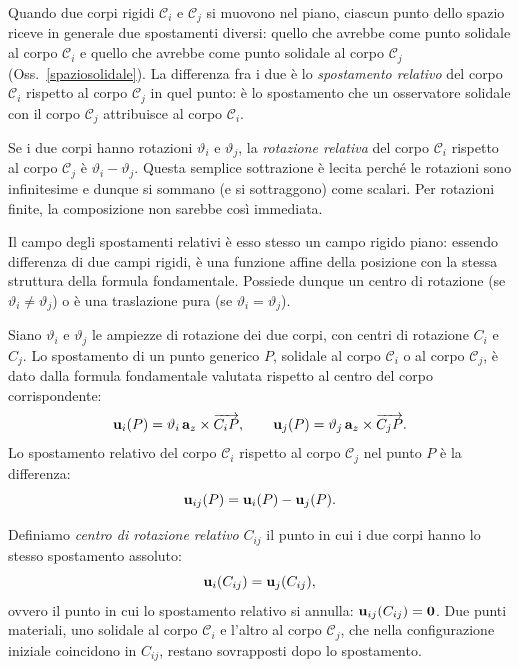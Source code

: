 Quando due corpi rigidi $\mathcal{C}_i$ e $\mathcal{C}_j$ si muovono nel piano,
ciascun punto dello spazio riceve in generale due spostamenti diversi: quello
che avrebbe come punto solidale al corpo $\mathcal{C}_i$ e quello che avrebbe
come punto solidale al corpo $\mathcal{C}_j$ (Oss.~\ref{spaziosolidale}). La
differenza fra i due è lo \textit{spostamento
	relativo} del corpo $\mathcal{C}_i$ rispetto al corpo
$\mathcal{C}_j$ in quel punto: è lo spostamento che un osservatore solidale
con il corpo $\mathcal{C}_j$ attribuisce al corpo $\mathcal{C}_i$.

Se i due corpi hanno rotazioni $\vartheta_i$ e $\vartheta_j$, la \textit{rotazione
	relativa} del corpo $\mathcal{C}_i$ rispetto al corpo
$\mathcal{C}_j$ è $\vartheta_i - \vartheta_j$. Questa semplice sottrazione è lecita
perché le rotazioni sono infinitesime e dunque si sommano (e si sottraggono) come
scalari. Per rotazioni finite, la composizione non sarebbe così immediata.

Il campo degli spostamenti relativi è esso stesso un campo rigido piano: essendo
differenza di due campi rigidi, è una funzione affine della posizione con la stessa
struttura della formula fondamentale. Possiede dunque un centro di rotazione (se
$\vartheta_i \neq \vartheta_j$) o è una traslazione pura (se
$\vartheta_i = \vartheta_j$).

\medskip

Siano $\vartheta_i$ e $\vartheta_j$ le ampiezze di rotazione dei due corpi, con
centri di rotazione $C_i$ e $C_j$. Lo spostamento di un punto generico $P$, solidale
al corpo $\mathcal{C}_i$ o al corpo $\mathcal{C}_j$, è dato dalla formula
fondamentale valutata rispetto al centro del corpo corrispondente:
\begin{equation}\label{eq:campi_assoluti_ij}
	\mathbf{u}_i(P) = \vartheta_i\,\mathbf{a}_z \times
	\overrightarrow{C_i P}, \qquad
	\mathbf{u}_j(P) = \vartheta_j\,\mathbf{a}_z \times
	\overrightarrow{C_j P}.
\end{equation}
Lo spostamento relativo del corpo $\mathcal{C}_i$ rispetto al corpo $\mathcal{C}_j$
nel punto $P$ è la differenza:
\begin{equation}\label{eq:spost_relativo}
	\mathbf{u}_{ij}(P) = \mathbf{u}_i(P) - \mathbf{u}_j(P).
\end{equation}

Definiamo \textit{centro di rotazione relativo}
$C_{ij}$  il punto in cui i due corpi hanno lo stesso spostamento assoluto:
\begin{equation}\label{eq:def_CR_relativo}
	\mathbf{u}_i(C_{ij}) = \mathbf{u}_j(C_{ij}),
\end{equation}
ovvero il punto in cui lo spostamento relativo si annulla: $\mathbf{u}_{ij}(C_{ij}) =
\mathbf{0}$. Due punti materiali, uno solidale al corpo $\mathcal{C}_i$ e l'altro al
corpo $\mathcal{C}_j$, che nella configurazione iniziale coincidono in $C_{ij}$,
restano sovrapposti dopo lo spostamento.

